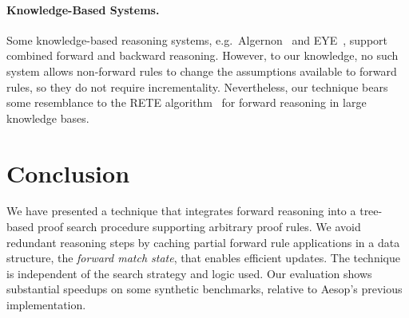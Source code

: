 \documentclass[runningheads,leqno]{llncs}
\begin{document}
\paragraph{Knowledge-Based Systems.}
Some knowledge-based reasoning systems, e.g.\ Algernon~\cite{Algernon} and EYE~\cite{EYE}, support combined forward and backward reasoning.
However, to our knowledge, no such system allows non-forward rules to change the assumptions available to forward rules, so they do not require incrementality.
Nevertheless, our technique bears some resemblance to the RETE algorithm~\cite{RETE} for forward reasoning in large knowledge bases.

\section{Conclusion}

We have presented a technique that integrates forward reasoning into a tree-based proof search procedure supporting arbitrary proof rules.
We avoid redundant reasoning steps by caching partial forward rule applications in a data structure, the \emph{forward match state}, that enables efficient updates.
The technique is independent of the search strategy and logic used.
Our evaluation shows substantial speedups on some synthetic benchmarks, relative to Aesop's previous implementation.


\end{document}
